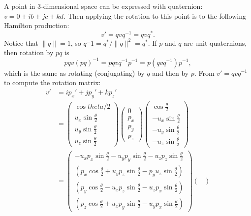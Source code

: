 \documentclass{article}
\begin{document}
A point in 3-dimensional space can be expressed with quaternion: $v = 0+ib+jc+kd$. Then applying the rotation to this point is to the following Hamilton production:
\begin{equation}
  v' = qvq^{-1} = qvq^*.
\end{equation}
Notice that $\|q\| = 1$, so $q^-1 = q^*/\|q\|^2 = q^*$. If $p$ and $q$ are unit quaternions, then rotation by $pq$ is
\begin{displaymath}
  pqv(pq)^{-1} = pqvq^{-1}p^{-1} = p(qvq^{-1})p^{-1},
\end{displaymath}
which is the same as rotating (conjugating) by $q$ and then by $p$. From $v' = qvq^{-1}$ to compute the rotation matrix:
\begin{displaymath}
  \begin{aligned}
    v' &= ip_x'+jp_y'+kp_z' \\
    &= \begin{pmatrix}
      \cos{theta/2}     \\
      u_x\sin{\frac{\theta}{2}}  \\
      u_y\sin{\frac{\theta}{2}}  \\
      u_z\sin{\frac{\theta}{2}}
    \end{pmatrix}\begin{pmatrix}
      0 \\p_x \\ p_y \\p_z 
    \end{pmatrix} \begin{pmatrix}
      \cos{\frac{\theta}{2}}      \\
      -u_x\sin{\frac{\theta}{2}}  \\
      -u_y\sin{\frac{\theta}{2}}  \\
      -u_z\sin{\frac{\theta}{2}}
    \end{pmatrix} \\
    &= \begin{pmatrix}
      -u_xp_x\sin{\frac{\theta}{2}}-u_yp_y\sin{\frac{\theta}{2}}-u_zp_z\sin{\frac{\theta}{2}} \\
      (p_x\cos{\frac{\theta}{2}}+u_yp_z\sin{\frac{\theta}{2}}-p_yu_z\sin{\frac{\theta}{2}})  \\
      (p_y\cos{\frac{\theta}{2}}-u_xp_z\sin{\frac{\theta}{2}}-u_zp_x\sin{\frac{\theta}{2}})  \\
      (p_z\cos{\frac{\theta}{2}}+u_xp_y\sin{\frac{\theta}{2}}-u_yp_x\sin{\frac{\theta}{2}})
    \end{pmatrix}\begin{pmatrix}

\end{pmatrix}
\end{aligned}
\end{displaymath}
\end{document}

